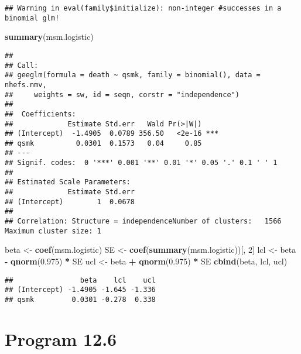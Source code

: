 \documentclass[
  10pt,
]{book}
\newenvironment{Shaded}{\begin{snugshade}}{\end{snugshade}}
\newcommand{\DecValTok}[1]{\textcolor[rgb]{0.00,0.00,0.81}{#1}}
\newcommand{\FloatTok}[1]{\textcolor[rgb]{0.00,0.00,0.81}{#1}}
\newcommand{\KeywordTok}[1]{\textcolor[rgb]{0.13,0.29,0.53}{\textbf{#1}}}
\newcommand{\NormalTok}[1]{#1}
\newcommand{\OperatorTok}[1]{\textcolor[rgb]{0.81,0.36,0.00}{\textbf{#1}}}
\newcommand{\StringTok}[1]{\textcolor[rgb]{0.31,0.60,0.02}{#1}}
\begin{document}
\begin{verbatim}
## Warning in eval(family$initialize): non-integer #successes in a binomial glm!
\end{verbatim}

\begin{Shaded}
\begin{Highlighting}[]
\KeywordTok{summary}\NormalTok{(msm.logistic)}
\end{Highlighting}
\end{Shaded}

\begin{verbatim}
## 
## Call:
## geeglm(formula = death ~ qsmk, family = binomial(), data = nhefs.nmv, 
##     weights = sw, id = seqn, corstr = "independence")
## 
##  Coefficients:
##             Estimate Std.err   Wald Pr(>|W|)    
## (Intercept)  -1.4905  0.0789 356.50   <2e-16 ***
## qsmk          0.0301  0.1573   0.04     0.85    
## ---
## Signif. codes:  0 '***' 0.001 '**' 0.01 '*' 0.05 '.' 0.1 ' ' 1
## 
## Estimated Scale Parameters:
##             Estimate Std.err
## (Intercept)        1  0.0678
## 
## Correlation: Structure = independenceNumber of clusters:   1566   Maximum cluster size: 1
\end{verbatim}

\begin{Shaded}
\begin{Highlighting}[]
\NormalTok{beta <-}\StringTok{ }\KeywordTok{coef}\NormalTok{(msm.logistic)}
\NormalTok{SE <-}\StringTok{ }\KeywordTok{coef}\NormalTok{(}\KeywordTok{summary}\NormalTok{(msm.logistic))[, }\DecValTok{2}\NormalTok{]}
\NormalTok{lcl <-}\StringTok{ }\NormalTok{beta }\OperatorTok{-}\StringTok{ }\KeywordTok{qnorm}\NormalTok{(}\FloatTok{0.975}\NormalTok{) }\OperatorTok{*}\StringTok{ }\NormalTok{SE}
\NormalTok{ucl <-}\StringTok{ }\NormalTok{beta }\OperatorTok{+}\StringTok{ }\KeywordTok{qnorm}\NormalTok{(}\FloatTok{0.975}\NormalTok{) }\OperatorTok{*}\StringTok{ }\NormalTok{SE}
\KeywordTok{cbind}\NormalTok{(beta, lcl, ucl)}
\end{Highlighting}
\end{Shaded}

\begin{verbatim}
##                beta    lcl    ucl
## (Intercept) -1.4905 -1.645 -1.336
## qsmk         0.0301 -0.278  0.338
\end{verbatim}

\hypertarget{program-12.6}{%
\section{Program 12.6}\label{program-12.6}}
\end{document}
